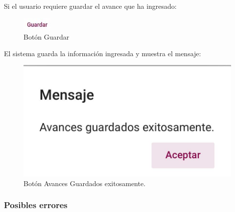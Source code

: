 \documentclass[10pt]{book}
\begin{document}
\pagebreak
Si el usuario requiere guardar el avance que ha ingresado: 

\begin{figure}[!hbtp]
    \centering
    \includegraphics[width=0.1\linewidth]{images/SP6/BotonGuardar.jpeg}
    \caption{Botón Guardar} 
\end{figure}

El sistema guarda la información ingresada y muestra el mensaje: 

\begin{figure}[!hbtp]
    \centering
    \includegraphics[width=0.4\linewidth]{images/SP6/BotonAvance.jpeg}
    \caption{Botón Avances Guardados exitosamente.} 
\end{figure}

\subsubsection{Posibles errores}
\end{document}
